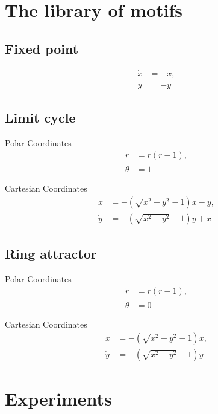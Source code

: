 \documentclass{article}
\theoremstyle{definition} \newtheorem{definition}{Definition}  \newtheorem{example}{Example}
\theoremstyle{remark} \newtheorem{remark}{Remark}
\newcounter{ct}
\begin{document}
\newpage
\section{The library of motifs}
\subsection{Fixed point}
\[
\begin{aligned}
\dot{x} &= -x, \\
\dot{y} &= -y
\end{aligned}
\]

\subsection{Limit cycle}
Polar Coordinates
\[
\begin{aligned}
\dot{r} &= r(r - 1), \\
\dot{\theta} &= 1 %
\end{aligned}
\]

Cartesian Coordinates
\[
\begin{aligned}
\dot{x} &= -\left( \sqrt{x^2 + y^2} - 1 \right) x - y, \\
\dot{y} &= -\left( \sqrt{x^2 + y^2} - 1 \right) y + x
\end{aligned}
\]

\subsection{Ring attractor}
Polar Coordinates
\[
\begin{aligned}
\dot{r} &= r(r - 1), \\
\dot{\theta} &= 0
\end{aligned}
\]

Cartesian Coordinates
\[
\begin{aligned}
\dot{x} &= -\left( \sqrt{x^2 + y^2} - 1 \right) x, \\
\dot{y} &= -\left( \sqrt{x^2 + y^2} - 1 \right) y
\end{aligned}
\]




\newpage
\section{Experiments}
\subsection{}
\end{document}
